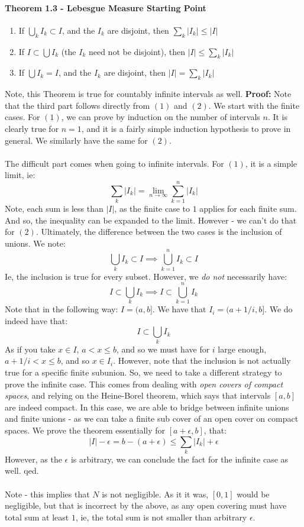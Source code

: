 \documentclass[12pt,a4paper]{article}
\newcommand{\1}[1]{\mathbbm{1}\left\{ #1 \right\}}
\begin{document}
\paragraph{Theorem 1.3 - Lebesgue Measure Starting Point}
\begin{enumerate}
	\item If $\bigcup_k I_k \subset I$, and the $I_k$ are disjoint, then $\sum_k |I_k| \leq |I|$
	\item If $I \subset \bigcup I_k$ (the $I_k$ need not be disjoint), then $|I| \leq \sum_k |I_k|$
	\item If $\bigcup I_k = I$, and the $I_k$ are disjoint, then $|I| = \sum_k |I_k|$
\end{enumerate}
Note, this Theorem is true for countably infinite intervals as well. \textbf{Proof:} Note that the third part follows directly from $(1)$ and $(2)$. We start with the finite cases. For $(1)$, we can prove by induction on the number of intervals $n$. It is clearly true for $n = 1$, and it is a fairly simple induction hypothesis to prove in general. We similarly have the same for $(2)$.
\\\\
The difficult part comes when going to infinite intervals. For $(1)$, it is a simple limit, ie:
$$
	\sum_k |I_k| = \lim_{n \to \infty} \sum_{k=1}^n |I_k|
$$
Note, each sum is less than $|I|$, as the finite case to $1$ applies for each finite sum. And so, the inequality can be expanded to the limit. However - we can't do that for $(2)$. Ultimately, the difference between the two cases is the inclusion of unions. We note:
$$
	\bigcup_k I_k \subset I \implies \bigcup_{k=1}^n I_k \subset I
$$
Ie, the inclusion is true for every subset. However, we \textit{do not} necessarily have:
$$
	I \subset \bigcup_k I_k \implies I \subset \bigcup_{k=1}^n I_k
$$
Note that in the following way: $I = (a,b]$. We have that $I_i = (a + 1/i, b]$. We do indeed have that:
$$
	I \subset \bigcup_k I_k
$$
As if you take $x \in I$, $a < x \leq b$, and so we must have for $i$ large enough, $a + 1/i < x \leq b$, and so $x \in I_i$. However, note that the inclusion is not actually true for a specific finite subunion. So, we need to take a different strategy to prove the infinite case. This comes from dealing with \textit{open covers of compact spaces}, and relying on the Heine-Borel theorem, which says that intervals $[a,b]$ are indeed compact. In this case, we are able to bridge between infinite unions and finite unions - as we can take a finite sub cover of an open cover on compact spaces. We prove the theorem essentially for $[a + \epsilon,b]$, that:
$$
	|I| - \epsilon = b - (a + \epsilon) \leq \sum_k |I_k| + \epsilon
$$
However, as the $\epsilon$ is arbitrary, we can conclude the fact for the infinite case as well. qed.
\\\\
Note - this implies that $N$ is not negligible. As it it was, $[0,1]$ would be negligible, but that is incorrect by the above, as any open covering must have total sum at least $1$, ie, the total sum is not smaller than arbitrary $\epsilon$.
\end{document}
